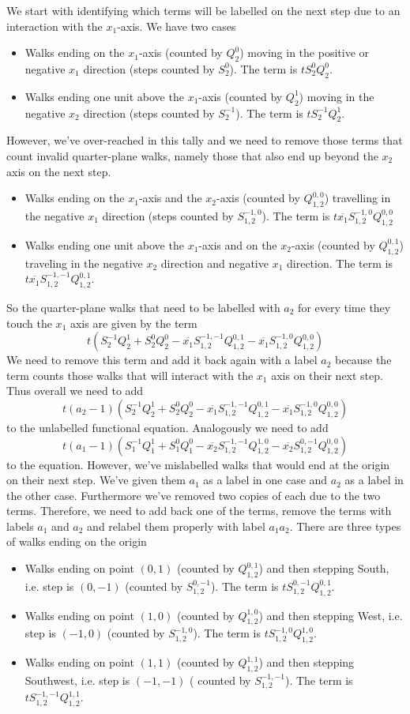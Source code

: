 \documentclass[12pt]{article}
\theoremstyle{definition} \newtheorem{definition}[theorem]{Definition}
\newcommand{\ol}[1]{\overline{#1}}
\newcommand{\Q}[2]{Q_{#1}^{#2}}
\newcommand{\Qf}[1]{Q_{1,2}^{#1}}
\newcommand{\es}[2]{S_{#1}^{#2}}
\newcommand{\Sf}[1]{S_{1,2}^{#1}}
\begin{document}
We start with identifying which terms will be labelled on the next step due to an interaction with the $x_1$-axis. We have two cases
\begin{itemize}
	\item Walks ending on the $x_1$-axis (counted by $Q_2^0$) moving in the positive or negative $x_1$ direction (steps counted by $S_2^0$). The term is $tS_2^0 Q_2^0$.
	\item Walks ending one unit above the $x_1$-axis (counted by $Q_2^1$) moving in the negative $x_2$ direction (steps counted by $S_2^{-1}$). The term is $tS_2^{-1} Q_2^1$.
\end{itemize}
However, we've over-reached in this tally and we need to remove those terms that count invalid quarter-plane walks, namely those that also end up beyond the $x_2$ axis on the next step. 
\begin{itemize}
	\item Walks ending on the $x_1$-axis and the $x_2$-axis (counted by $\Qf{0,0}$) travelling in the negative $x_1$ direction (steps counted by $\Sf{-1,0}$). The term is $t\ol{x_1}\Sf{-1,0}\Qf{0,0}$
	\item Walks ending one unit above the $x_1$-axis and on the $x_2$-axis (counted by $\Qf{0,1}$) traveling in the negative $x_2$ direction and negative $x_1$ direction. The term is $t\ol{x_1}\Sf{-1,-1}\Qf{0,1}$.
\end{itemize}
So the quarter-plane walks that need to be labelled with $a_2$ for every time they touch the $x_1$ axis are given by the term
\[
	t(\es{2}{-1}\Q{2}{1}+\es{2}{0}\Q{2}{0}-\ol{x_1}\Sf{-1,-1}\Qf{0,1}-\ol{x_1}\Sf{-1,0}\Qf{0,0})
\]
We need to remove this term and add it back again with a label $a_2$ because the term counts those walks that will interact with the $x_1$ axis on their next step. Thus overall we need to add
\[
	t(a_2-1)(\es{2}{-1}\Q{2}{1}+\es{2}{0}\Q{2}{0}-\ol{x_1}\Sf{-1,-1}\Qf{0,1}-\ol{x_1}\Sf{-1,0}\Qf{0,0})
\]
to the unlabelled functional equation. Analogously we need to add
\[
	t(a_1-1)(\es{1}{-1}\Q{1}{1}+\es{1}{0}\Q{1}{0}-\ol{x_2}\Sf{-1,-1}\Qf{1,0}-\ol{x_2}\Sf{0,-1}\Qf{0,0})
\]
to the equation. However, we've mislabelled walks that would end at the origin on their next step. We've given them $a_1$ as a label in one case and $a_2$ as a label in the other case. Furthermore we've removed two copies of each due to the two terms. Therefore, we need to add back one of the terms, remove the terms with labels $a_1$ and $a_2$ and relabel them properly with label $a_1a_2$. There are three types of walks ending on the origin
\begin{itemize}
	\item Walks ending on point $(0,1)$ (counted by $\Qf{0,1}$) and then stepping South, i.e. step is $(0,-1)$ (counted by $\Sf{0,-1}$). The term is $t\Sf{0,-1}\Qf{0,1}$.
	\item Walks ending on point $(1,0)$ (counted by $\Qf{1,0}$) and then stepping West, i.e. step is $(-1,0)$ (counted by $\Sf{-1,0}$). The term is $t\Sf{-1,0}\Qf{1,0}$.
	\item Walks ending on point $(1,1)$ (counted by $\Qf{1,1}$) and then stepping Southwest, i.e. step is $(-1,-1)$ ( counted by $\Sf{-1,-1}$). The term is $t\Sf{-1,-1}\Qf{1,1}$.
\end{itemize}
\end{document}
